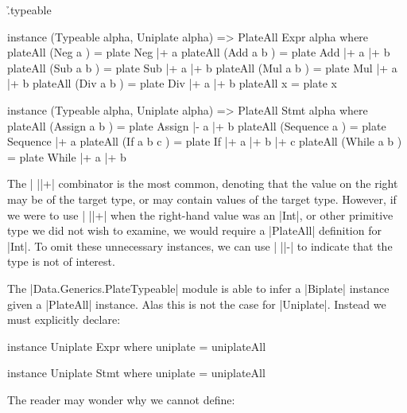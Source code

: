 \begin{comment}
\h{.typeable}\begin{code}
type Type from to = (Str to, Str to -> from)
uniplateAll :: PlateAll a b => a -> (Str b, Str b -> a)
class PlateAll from to where
    plateAll :: from -> Type from to
plate :: from -> Type from to
(|+) :: (Typeable item, Typeable to, PlateAll item to) => Type (item -> from) to -> item -> Type from to
(|-) :: Type (item -> from) to -> item -> Type from to
instance (PlateAll from to, Typeable from, Typeable to, Uniplate to) => PlateAll [from] to where
\end{code}
\end{comment}

\h{.typeable}\begin{code}
instance (Typeable alpha, Uniplate alpha) => PlateAll Expr alpha where
    plateAll (Neg a    )  = plate Neg  |+ a
    plateAll (Add a b  )  = plate Add  |+ a |+ b
    plateAll (Sub a b  )  = plate Sub  |+ a |+ b
    plateAll (Mul a b  )  = plate Mul  |+ a |+ b
    plateAll (Div a b  )  = plate Div  |+ a |+ b
    plateAll x            = plate x

instance (Typeable alpha, Uniplate alpha) => PlateAll Stmt alpha where
    plateAll (Assign    a b    ) = plate Assign    |-  a |+ b
    plateAll (Sequence  a      ) = plate Sequence  |+  a
    plateAll (If        a b c  ) = plate If        |+  a |+ b |+ c
    plateAll (While     a b    ) = plate While     |+  a |+ b
\end{code}

The | ||+| combinator is the most common, denoting that the value on the right may be of the target type, or may contain values of the target type. However, if we were to use | ||+| when the right-hand value was an |Int|, or other primitive type we did not wish to examine, we would require a |PlateAll| definition for |Int|. To omit these unnecessary instances, we can use | ||-| to indicate that the type is not of interest.

The |Data.Generics.PlateTypeable| module is able to infer a |Biplate| instance given a |PlateAll| instance. Alas this is not the case for |Uniplate|. Instead we must explicitly declare:

\ignore\begin{code}
instance Uniplate Expr where
    uniplate = uniplateAll

instance Uniplate Stmt where
    uniplate = uniplateAll
\end{code}

The reader may wonder why we cannot define:

